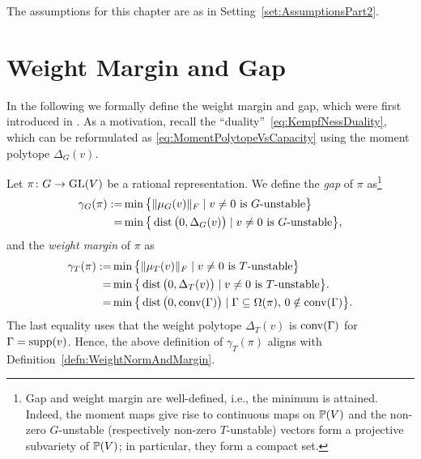 The assumptions for this chapter are as in Setting~\ref{set:AssumptionsPart2}.





\section{Weight Margin and Gap} \label{sec:WeightMarginGapDefinition}

In the following we formally define the weight margin and gap, which were first introduced in \cite{GradflowArXiv}. As a motivation, recall the ``duality''~\eqref{eq:KempfNessDuality}, which can be reformulated as \eqref{eq:MomentPolytopeVsCapacity} using the moment polytope $\Delta_G(v)$.

\begin{defn} \label{defn:WeightMarginGapConstant}
	Let $\pi \colon G \to \operatorname{GL}(V)$ be a rational representation. We define the \emph{gap} of $\pi$ as\footnote{Gap and weight margin are well-defined, i.e., the minimum is attained. Indeed, the moment maps give rise to continuous maps on $\mathbb P(V)$ and the non-zero $G$-unstable (respectively non-zero $T$-unstable) vectors form a projective subvariety of $\mathbb P(V)$; in particular, they form a compact set.}
	\begin{align*}
		\gamma_G(\pi) := &\min \big\lbrace \lVert\mu_G(v)\rVert_F \mid v \neq 0 \text{ is } G\text{-unstable} \big\rbrace \\
		= &\min \big\lbrace \operatorname{dist} \big( 0, \Delta_G(v) \big) \mid v \neq 0 \text{ is } G\text{-unstable} \big\rbrace,
	\end{align*}
	and the \emph{weight margin} of $\pi$ as
	\begin{align*}
		\gamma_{T}(\pi) := &\min \big\lbrace \lVert\mu_{T}(v)\rVert_F \mid v \neq 0 \text{ is } T\text{-unstable} \big\rbrace
		\\ = &\min \big\lbrace \operatorname{dist} \big(0, \Delta_{T}(v)\big) \mid v \neq 0 \text{ is } T\text{-unstable} \big\rbrace.
		\\ = &\min \big\lbrace \operatorname{dist} \big(0, \operatorname{conv}(\Gamma)\big) \mid \Gamma \subseteq \Omega(\pi), \, 0 \notin \operatorname{conv}(\Gamma) \big\rbrace.
	\end{align*}
	The last equality uses that the weight polytope $\Delta_T(v)$ is $\operatorname{conv}(\Gamma)$ for $\Gamma = \operatorname{supp}(v)$. Hence, the above definition of $\gamma_T(\pi)$ aligns with Definition~\ref{defn:WeightNormAndMargin}.
	\hfill{}
\end{defn}

